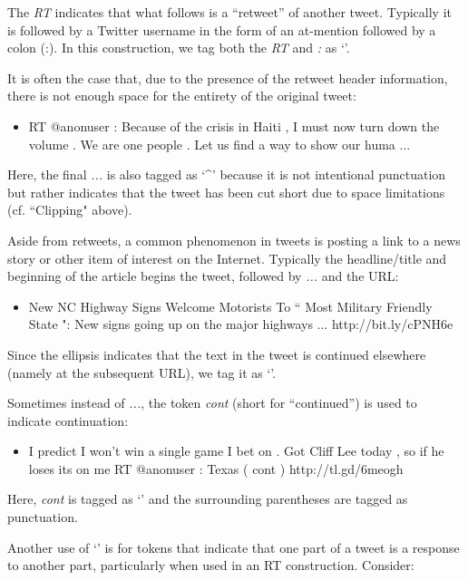 \documentclass[11pt,letterpaper]{article}
\begin{document}
The \emph{RT} indicates that what follows is a ``retweet'' of another tweet. Typically it is followed by a Twitter username in the form of an at-mention followed by a colon (:). In this construction, we tag both the \emph{RT} and \emph{:} as `\texttildelow'.

It is often the case that, due to the presence of the retweet header information, there is not enough space for the entirety of the original tweet:

\begin{itemize}
\item RT @anonuser : Because of the crisis in Haiti , I must now turn down the volume . We are one people . Let us find a way to show our huma ...
\end{itemize}

Here, the final \emph{...} is also tagged as `\textasciicircum' because it is not 
intentional punctuation but rather indicates that the tweet has been cut short due to space limitations (cf. ``Clipping" above). 

Aside from retweets, a common phenomenon in tweets is posting a link to a news story or other 
item of interest on the Internet. Typically the headline/title and beginning of the article 
begins the tweet, followed by \emph{...} and the URL:

\begin{itemize}
\item New NC Highway Signs Welcome Motorists To `` Most Military Friendly State ": New signs going up on the major highways ... http://bit.ly/cPNH6e  
\end{itemize}
\noindent Since the ellipsis indicates that the text in the tweet is continued elsewhere (namely 
at the subsequent URL), we tag it as `\texttildelow'. 

Sometimes instead of \emph{...}, the token \emph{cont} (short for ``continued'') is used to indicate continuation:

\begin{itemize}
\item I predict I won't win a single game I bet on . Got Cliff Lee today , so if he loses its on me RT @anonuser : Texas ( cont ) http://tl.gd/6meogh
\end{itemize}
\noindent Here, \emph{cont} is tagged as `\texttildelow' and the surrounding parentheses are tagged as punctuation.

Another use of `\texttildelow' is for tokens that indicate that one part of a tweet is a response to 
another part, particularly when used in an RT construction. Consider:
\end{document}
